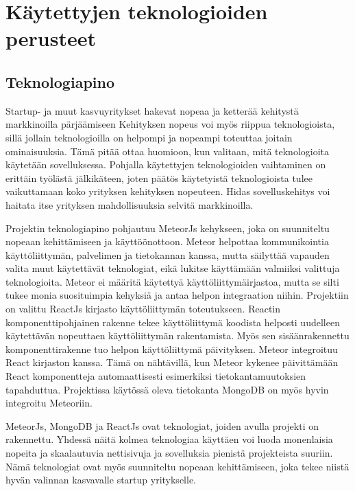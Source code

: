 \documentclass[11pt,a4paper,titlepage,oneside]{article}
\begin{document}
\newpage
\section{Käytettyjen teknologioiden perusteet}                %



\subsection{Teknologiapino}



Startup- ja muut kasvuyritykset hakevat nopeaa ja ketterää kehitystä markkinoilla pärjäämiseen
Kehityksen nopeus voi myös riippua teknologioista, sillä jollain teknologioilla on helpompi ja nopeampi toteuttaa joitain ominaisuuksia.
Tämä pitää ottaa huomioon, kun valitaan, mitä teknologioita käytetään sovelluksessa.
Pohjalla käytettyjen teknologioiden vaihtaminen on erittäin työlästä jälkikäteen,
joten päätös käytetyistä teknologioista tulee vaikuttamaan koko yrityksen kehityksen nopeuteen.
Hidas sovelluskehitys voi haitata itse yrityksen mahdollisuuksia selvitä markkinoilla.
\medskip



Projektin teknologiapino pohjautuu MeteorJs kehykseen, joka on suunniteltu nopeaan kehittämiseen ja käyttöönottoon.
Meteor helpottaa kommunikointia käyttöliittymän, palvelimen ja tietokannan kanssa, 
mutta säilyttää vapauden valita muut käytettävät teknologiat, eikä lukitse käyttämään valmiiksi valittuja teknologioita.
Meteor ei määritä käytettyä käyttöliittymäirjastoa, mutta se silti tukee monia suosituimpia kehyksiä ja antaa helpon integraation niihin.
Projektiin on valittu ReactJs kirjasto käyttöliittymän toteutukseen.
Reactin komponenttipohjainen rakenne tekee käyttöliittymä koodista helposti uudelleen käytettävän nopeuttaen käyttöliittymän rakentamista. 
Myös sen sisäänrakennettu komponenttirakenne tuo helpon käyttöliittymä päivityksen.
Meteor integroituu React kirjaston kanssa.
Tämä on nähtävillä, kun Meteor kykenee päivittämään React komponentteja automaattisesti esimerkiksi tietokantamuutoksien tapahduttua. 
Projektissa käytössä oleva tietokanta MongoDB on myös hyvin integroitu Meteoriin.
\medskip


MeteorJs, MongoDB ja ReactJs ovat teknologiat, joiden avulla projekti on rakennettu.
Yhdessä näitä kolmea teknologiaa käyttäen voi luoda monenlaisia nopeita ja skaalautuvia nettisivuja ja sovelluksia pienistä projekteista suuriin.
Nämä teknologiat ovat myös suunniteltu nopeaan kehittämiseen, joka tekee niistä hyvän valinnan kasvavalle startup yritykselle.
\medskip
\end{document}
